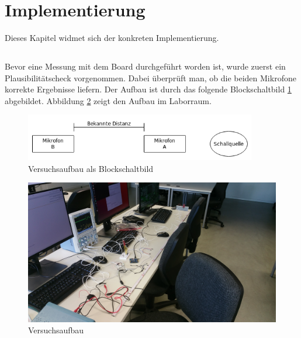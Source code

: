 \newpage
\section{Implementierung}
Dieses Kapitel widmet sich der konkreten Implementierung.

\subsection{\microphone}
Bevor eine Messung mit dem Board durchgeführt worden ist, wurde zuerst ein Plausibilitätscheck vorgenommen. Dabei überprüft man, ob die beiden \microphone \platz Mikrofone korrekte Ergebnisse liefern. Der Aufbau ist durch das folgende Blockschaltbild \ref{img:blockschaltbild_plausibilitaetscheck} abgebildet. Abbildung \ref{img:picture_plausibilitaetscheck} zeigt den Aufbau im Laborraum.

\begin{figure}[H]
\centering
\includegraphics[width=0.9\textwidth]{images/plausibilitaetscheck.png}
\caption{Versuchsaufbau als Blockschaltbild}
\label{img:blockschaltbild_plausibilitaetscheck}
\end{figure}

\begin{figure}[H]
\centering
\hspace*{-1.9cm}
\includegraphics[width=1.2\textwidth]{images/plausibilitaetscheck_sparkfun_foto.jpg}
\caption{Versuchsaufbau}
\label{img:picture_plausibilitaetscheck}
\end{figure}

